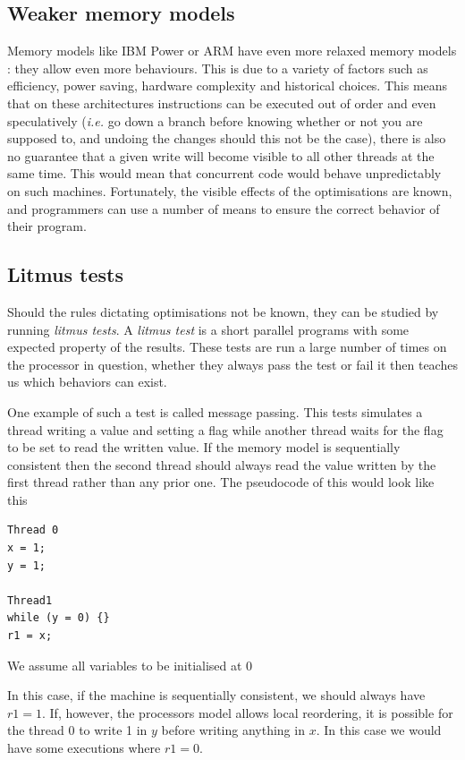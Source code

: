 \documentclass[a4,11pt]{article}
\begin{document}
\subsection{Weaker memory models}

Memory models like IBM Power or ARM have even more relaxed memory models : they allow even more behaviours. This is due to a variety of factors such as efficiency, power saving, hardware complexity and historical choices. This means that on these architectures instructions can be executed out of order and even speculatively (\emph{i.e.} go down a branch before knowing whether or not you are supposed to, and undoing the changes should this not be the case), there is also no guarantee that a given write will become visible to all other threads at the same time. This would mean that concurrent code would behave unpredictably on such machines. Fortunately, the visible effects of the optimisations are known, and programmers can use a number of means to ensure the correct behavior of their program.

\subsection{Litmus tests}

Should the rules dictating optimisations not be known, they can be studied by running \emph{litmus tests}. A \emph{litmus test} is a short parallel programs with some expected property of the results. These tests are run a large number of times on the processor in question, whether they always pass the test or fail it then teaches us which behaviors can exist.

One example of such a test is called message passing. This tests simulates a thread writing a value and setting a flag while another thread waits for the flag to be set to read the written value. If the memory model is sequentially consistent then the second thread should always read the value written by the first thread rather than any prior one. The pseudocode of this would look like this

\begin{lstlisting}
Thread 0
x = 1;
y = 1;

Thread1
while (y = 0) {}
r1 = x;
\end{lstlisting}

{\footnotesize{We assume all variables to be initialised at 0}}

In this case, if the machine is sequentially consistent, we should always have $r1 = 1$. If, however, the processors model allows local reordering, it is possible for the thread 0 to write 1 in $y$ before writing anything in $x$. In this case we would have some executions where $r1 = 0$.
\end{document}
